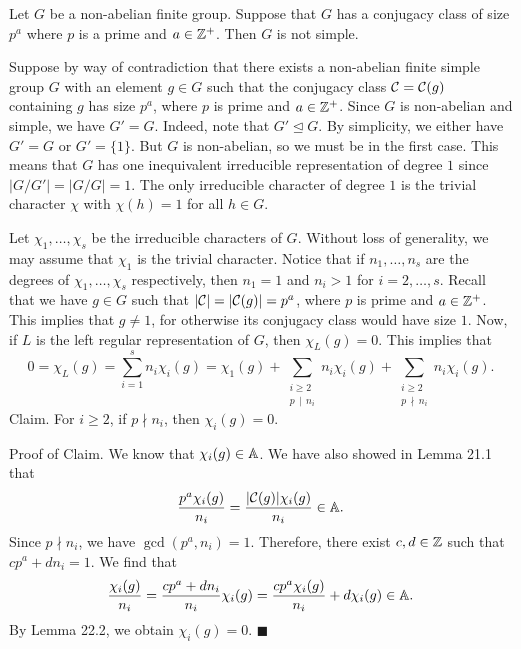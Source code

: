 \begin{theo}{}
    Let $G$ be a non-abelian finite group. Suppose that $G$ has a conjugacy 
    class of size $p^a$ where $p$ is a prime and $a \in \mathbb{Z}^+$. Then $G$ is 
    not simple. 
\end{theo}
\begin{pf}
    Suppose by way of contradiction that there exists a non-abelian finite 
    simple group $G$ with an element $g \in G$ such that the conjugacy class 
    ${\cal C} = {\cal C}(g)$ containing $g$ has size $p^a$, where $p$ is prime and 
    $a \in \mathbb{Z}^+$. Since $G$ is non-abelian and simple, we have $G' = G$. 
    Indeed, note that $G' \trianglelefteq G$. By simplicity, we either 
    have $G' = G$ or $G' = \{1\}$. But $G$ is non-abelian, so we must be in the first 
    case. This means that $G$ has one inequivalent irreducible representation 
    of degree $1$ since $|G/G'| = |G/G| = 1$. The only irreducible character 
    of degree $1$ is the trivial character $\chi$ with $\chi(h) = 1$ for all $h \in G$.

    Let $\chi_1, \dots, \chi_s$ be the irreducible characters of $G$. Without 
    loss of generality, we may assume that $\chi_1$ is the trivial character. 
    Notice that if $n_1, \dots, n_s$ are the degrees of $\chi_1, \dots, \chi_s$ 
    respectively, then $n_1 = 1$ and $n_i > 1$ for $i = 2, \dots, s$. Recall 
    that we have $g \in G$ such that $|{\cal C}| = |{\cal C}(g)| = p^a$, 
    where $p$ is prime and $a \in \mathbb{Z}^+$. This implies that $g \neq 1$, for 
    otherwise its conjugacy class would have size $1$. Now, if $L$ is the 
    left regular representation of $G$, then $\chi_L(g) = 0$. This implies that 
    \[ 0 = \chi_L(g) = \sum_{i=1}^s n_i \chi_i(g) 
    = \chi_1(g) + \sum_{\substack{i\geq 2 \\ p\,\mid\,n_i}} n_i \chi_i(g) 
    + \sum_{\substack{i\geq 2 \\ p\,\nmid\,n_i}} n_i \chi_i(g). \]
    {\sc Claim.} For $i \geq 2$, if $p \nmid n_i$, then $\chi_i(g) = 0$. 

    {\sc Proof of Claim.} We know that $\chi_i(g) \in \mathbb{A}$. We have also showed 
    in Lemma 21.1 that 
    \[ \frac{p^a \chi_i(g)}{n_i} = \frac{|{\cal C}(g)| \chi_i(g)}{n_i} \in \mathbb{A}. \] 
    Since $p \nmid n_i$, we have $\gcd(p^a, n_i) = 1$. Therefore, there 
    exist $c, d \in \mathbb{Z}$ such that $cp^a + dn_i = 1$. We find that 
    \[ \frac{\chi_i(g)}{n_i} = \frac{cp^a + dn_i}{n_i} \chi_i(g) 
    = \frac{cp^a \chi_i(g)}{n_i} + d\chi_i(g) \in \mathbb{A}. \] 
    By Lemma 22.2, we obtain $\chi_i(g) = 0$. \hfill$\blacksquare$ 


\end{pf}
